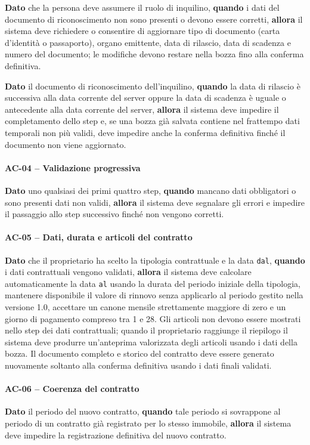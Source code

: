 \documentclass[12pt,a4paper]{article}
\begin{document}
\textbf{Dato} che la persona deve assumere il ruolo di inquilino,
\textbf{quando} i dati del documento di riconoscimento non sono presenti o devono essere corretti,
\textbf{allora} il sistema deve richiedere o consentire di aggiornare tipo di documento
(carta d'identità o passaporto), organo emittente, data di rilascio,
data di scadenza e numero del documento; le modifiche devono restare nella bozza fino alla
conferma definitiva.

\textbf{Dato} il documento di riconoscimento dell'inquilino,
\textbf{quando} la data di rilascio è successiva alla data corrente del server oppure la data di
scadenza è uguale o antecedente alla data corrente del server,
\textbf{allora} il sistema deve impedire il completamento dello step e, se una bozza già
salvata contiene nel frattempo dati temporali non più validi, deve impedire anche la conferma
definitiva finché il documento non viene aggiornato.

\paragraph{AC-04 -- Validazione progressiva}
\textbf{Dato} uno qualsiasi dei primi quattro step,
\textbf{quando} mancano dati obbligatori o sono presenti dati non validi,
\textbf{allora} il sistema deve segnalare gli errori e impedire il passaggio allo step
successivo finché non vengono corretti.

\paragraph{AC-05 -- Dati, durata e articoli del contratto}
\textbf{Dato} che il proprietario ha scelto la tipologia contrattuale e la data
\texttt{dal},
\textbf{quando} i dati contrattuali vengono validati,
\textbf{allora} il sistema deve calcolare automaticamente la data \texttt{al} usando
la durata del periodo iniziale della tipologia, mantenere disponibile il valore di rinnovo
senza applicarlo al periodo gestito nella versione 1.0, accettare un canone mensile
strettamente maggiore di zero e un giorno di pagamento compreso tra 1 e 28. Gli articoli non devono essere mostrati nello step dei dati contrattuali;
quando il proprietario raggiunge il riepilogo il sistema deve produrre un'anteprima valorizzata
degli articoli usando i dati della bozza. Il documento completo e storico del contratto deve
essere generato nuovamente soltanto alla conferma definitiva usando i dati finali validati.

\paragraph{AC-06 -- Coerenza del contratto}
\textbf{Dato} il periodo del nuovo contratto,
\textbf{quando} tale periodo si sovrappone al periodo di un contratto già registrato per lo stesso
immobile,
\textbf{allora} il sistema deve impedire la registrazione definitiva del nuovo contratto.
\end{document}
